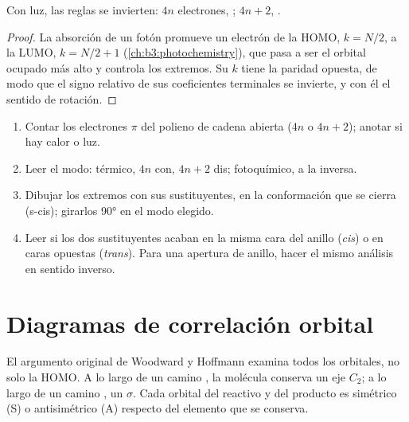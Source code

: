 \begin{proposition}\label{prop:b3:pericyclic:photo-electrocyclic}
Con luz, las reglas se invierten: $4n$ electrones, ; $4n + 2$, .
\end{proposition}

\begin{proof}
La absorción de un fotón promueve un electrón de la HOMO, $k = N/2$, a la LUMO, $k = N/2 + 1$
(\cref{ch:b3:photochemistry}), que pasa a ser el orbital ocupado más alto y
controla los extremos. Su $k$ tiene la paridad opuesta, de modo que el signo relativo de sus
coeficientes terminales se invierte, y con él el sentido de rotación.
\end{proof}

\begin{method}\label{met:b3:pericyclic:predict-stereo}
\begin{enumerate}
  \item Contar los electrones $\pi$ del polieno de cadena abierta ($4n$ o $4n + 2$); anotar si hay calor o
        luz.
  \item Leer el modo: térmico, $4n$ con, $4n + 2$ dis; fotoquímico, a la inversa.
  \item Dibujar los extremos con sus sustituyentes, en la conformación que
        se cierra (s-cis); girarlos 90° en el modo elegido.
  \item Leer si los dos sustituyentes acaban en la misma cara del anillo
        (\textit{cis}) o en caras opuestas (\textit{trans}). Para una apertura de anillo, hacer el mismo
        análisis en sentido inverso.
\end{enumerate}
\end{method}

\section{Diagramas de correlación orbital}

El argumento original de Woodward y Hoffmann examina todos los orbitales, no solo
la HOMO. A lo largo de un camino , la molécula conserva un eje $C_2$; a lo largo de un
camino , un  $\sigma$. Cada orbital del reactivo y del
producto es simétrico (S) o antisimétrico (A) respecto del elemento que
se conserva.

